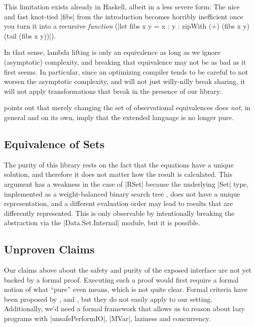 \documentclass[manuscript,screen,acmsmall,nonacm]{acmart}
\begin{document}
This limitation exists already in Haskell, albeit in a less severe form: The nice and fast knot-tied |fibs| from the introduction becomes horribly inefficient once you turn it into a recursive \emph{function} (|let fibs x y = x : y  : zipWith (+) (fibs x y) (tail (fibs x y))|).

In that sense, lambda lifting is only an equivalence as long as we ignore (asymptotic) complexity, and breaking that equivalence may not be as bad as it first seems.
In particular, since an optimizing compiler tends to be careful to not worsen the asymptotic complexity, and will not just willy-nilly break sharing, it will not apply transformations that break in the presence of our library.

 points out that merely changing the set of observational equivalences does \emph{not}, in general and on its own, imply that the extended language is no longer pure.

\subsection{Equivalence of Sets}

The purity of this library rests on the fact that the equations have a unique solution, and therefore it does not matter how the result is calculated. This argument has a weakness in the case of |RSet| because the underlying |Set| type, implemented as a weight-balanced binary search tree \citep{adams-tr,nievergelt}, does not have a unique representation, and a different evaluation order may lead to results that are differently represented. This is only observable by intentionally breaking the abstraction via the |Data.Set.Internal| module, but it is possible.

\subsection{Unproven Claims}

Our claims above about the safety and purity of the exposed interface are not yet backed by a formal proof. Executing such a proof would first require a formal notion of what “pure” even means, which is not quite clear. Formal criteria have been proposed by \citet{sabry}, \citet{longley} and \cite{pure-functional}, but they do not easily apply to our setting. Additionally, we’d need a formal framework that allows us to reason about lazy programs with |unsafePerformIO|, |MVar|, laziness and concurrency.
\end{document}
